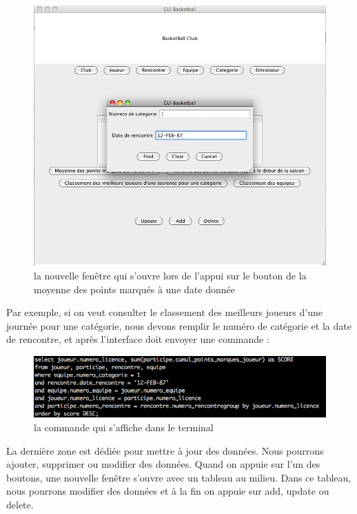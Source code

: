 \documentclass{article}
\begin{document}
\begin{figure}[!h]
\centering
\includegraphics[scale = 0.4] {2.png}
\caption{la nouvelle fenêtre qui s'ouvre lors de l'appui sur le bouton de la moyenne des points marqués à une date donnée }
\end{figure}

\newpage

Par exemple, si on veut consulter le classement des meilleurs joueurs d'une journée pour une catégorie, nous devons remplir le numéro de catégorie et la date de rencontre, et après l'interface doit envoyer une commande : \\


\begin{figure}[!h]
\centering
\includegraphics[scale = 0.5] {3.png}
\caption{la commande qui s'affiche dans le terminal}
\end{figure}

La dernière zone est dédiée pour mettre à jour des données. Nous pourrons ajouter, supprimer ou modifier des données. Quand on appuie sur l'un des boutons, une nouvelle fenêtre s'ouvre avec un tableau au milieu. Dans ce tableau, nous pourrons modifier des données et à la fin on appuie sur add, update ou delete. \\
\end{document}
